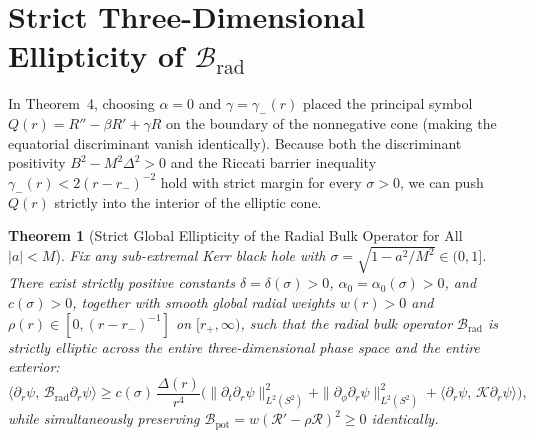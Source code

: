 \documentclass[11pt, a4paper]{article}
\newtheorem{theorem}{Theorem}
\theoremstyle{remark}
\begin{document}
\section{Strict Three-Dimensional Ellipticity of $\mathcal{B}_{\mathrm{rad}}$}

In Theorem~4, choosing $\alpha = 0$ and $\gamma = \gamma_-(r)$ placed the principal symbol $Q(r) = R'' - \beta R' + \gamma R$ on the boundary of the nonnegative cone (making the equatorial discriminant vanish identically). Because both the discriminant positivity $B^2 - M^2\Delta^2 > 0$ and the Riccati barrier inequality $\gamma_-(r) < 2(r - r_-)^{-2}$ hold with strict margin for every $\sigma > 0$, we can push $Q(r)$ strictly into the interior of the elliptic cone.

\begin{theorem}[Strict Global Ellipticity of the Radial Bulk Operator for All $|a| < M$]
\label{thm:strict-elliptic}
Fix any sub-extremal Kerr black hole with $\sigma = \sqrt{1 - a^2/M^2} \in (0, 1]$. There exist strictly positive constants $\delta = \delta(\sigma) > 0$, $\alpha_0 = \alpha_0(\sigma) > 0$, and $c(\sigma) > 0$, together with smooth global radial weights $w(r) > 0$ and $\rho(r) \in [0, (r - r_-)^{-1}]$ on $[r_+, \infty)$, such that the radial bulk operator $\mathcal{B}_{\mathrm{rad}}$ is strictly elliptic across the entire three-dimensional phase space and the entire exterior:
\begin{equation}
\label{eq:strict-elliptic}
\langle \partial_r\psi,\, \mathcal{B}_{\mathrm{rad}}\partial_r\psi \rangle \ge c(\sigma)\,\frac{\Delta(r)}{r^4}\Big(\|\partial_t\partial_r\psi\|_{L^2(S^2)}^2 + \|\partial_\phi\partial_r\psi\|_{L^2(S^2)}^2 + \langle \partial_r\psi,\, \mathcal{K}\partial_r\psi \rangle\Big),
\end{equation}
while simultaneously preserving $\mathcal{B}_{\mathrm{pot}} = w(\mathcal{R}' - \rho\mathcal{R})^2 \ge 0$ identically.
\end{theorem}
\end{document}
